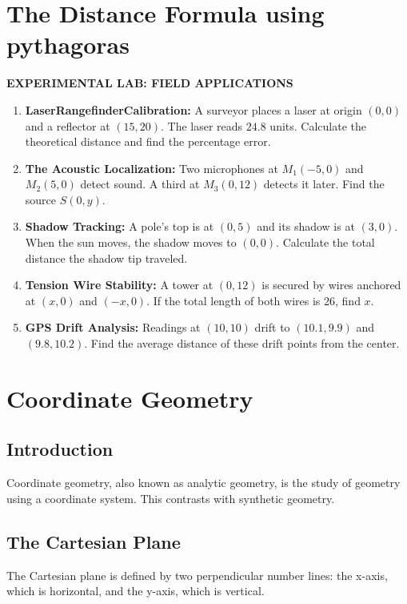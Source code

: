 \chapter{The Distance Formula using pythagoras}
\noindent
\colorbox{practicegreen}{\parbox{\dimexpr\linewidth-2\fboxsep}{\centering\small\bfseries\color{white} EXPERIMENTAL LAB: FIELD APPLICATIONS}}
\vspace{15pt}

\begin{enumerate}
    \item \textbf{LaserRangefinderCalibration:} A surveyor places a laser at origin $(0,0)$ and a reflector at $(15, 20)$. The laser reads $24.8$ units. Calculate the theoretical distance and find the percentage error.
    \item \textbf{The Acoustic Localization:} Two microphones at $M_1(-5, 0)$ and $M_2(5, 0)$ detect sound. A third at $M_3(0, 12)$ detects it later. Find the source $S(0, y)$.
    \item \textbf{Shadow Tracking:} A pole's top is at $(0, 5)$ and its shadow is at $(3, 0)$. When the sun moves, the shadow moves to $(0, 0)$. Calculate the total distance the shadow tip traveled.
    \item \textbf{Tension Wire Stability:} A tower at $(0, 12)$ is secured by wires anchored at $(x, 0)$ and $(-x, 0)$. If the total length of both wires is 26, find $x$.
    \item \textbf{GPS Drift Analysis:} Readings at $(10, 10)$ drift to $(10.1, 9.9)$ and $(9.8, 10.2)$. Find the average distance of these drift points from the center.
\end{enumerate}

\chapter{Coordinate Geometry}
\section{Introduction}
Coordinate geometry, also known as analytic geometry, is the study of geometry using a coordinate system. This contrasts with synthetic geometry.

\section{The Cartesian Plane}
The Cartesian plane is defined by two perpendicular number lines: the x-axis, which is horizontal, and the y-axis, which is vertical.

